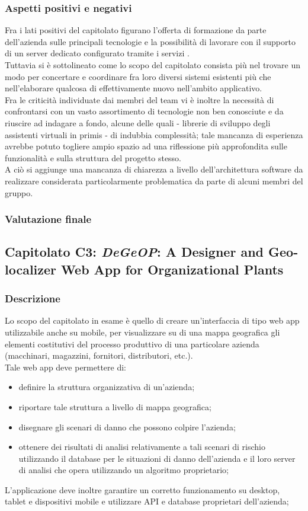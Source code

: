 		\subsubsection{Aspetti positivi e negativi}
		Fra i lati positivi del capitolato figurano l'offerta di formazione da parte dell'azienda sulle principali tecnologie e la possibilità di 
		lavorare con il supporto di un server dedicato configurato tramite i servizi .\\
		Tuttavia si è sottolineato come lo scopo del capitolato consista più nel trovare un modo per concertare e coordinare fra loro diversi sistemi 
		esistenti più che nell'elaborare qualcosa di effettivamente nuovo nell'ambito applicativo.\\
		Fra le criticità individuate dai membri del team vi è inoltre la necessità di confrontarsi con un vasto assortimento di tecnologie non ben 
		conosciute e da riuscire ad indagare a fondo, alcune delle quali - librerie di sviluppo degli assistenti virtuali in primis - di indubbia 
		complessità; tale mancanza di esperienza avrebbe potuto togliere ampio spazio ad una riflessione più approfondita sulle funzionalità e sulla 
		struttura del progetto stesso.\\
		A ciò si aggiunge una mancanza di chiarezza a livello dell'architettura software da realizzare considerata particolarmente problematica da 
		parte di alcuni membri del gruppo.
		\subsubsection{Valutazione finale}
		
	\subsection{Capitolato C3: \emph{DeGeOP}: A Designer and Geo-localizer Web App for Organizational Plants}
		\subsubsection{Descrizione}
		Lo scopo del capitolato in esame è quello di creare un'interfaccia di tipo web app utilizzabile anche su mobile, per visualizzare su di una 
		mappa geografica gli elementi costitutivi del processo produttivo di una particolare azienda (macchinari, magazzini, fornitori, distributori, etc.).
		\\Tale web app deve permettere di:
		\begin{itemize}
			\item definire la struttura organizzativa di un'azienda;
			\item riportare tale struttura a livello di mappa geografica;
			\item disegnare gli scenari di danno che possono colpire l'azienda;
			\item ottenere dei risultati di analisi relativamente a tali scenari di rischio utilizzando il database per le situazioni di danno dell'azienda e il loro server di analisi che opera utilizzando un algoritmo proprietario;
		\end{itemize}
		L'applicazione deve inoltre garantire un corretto funzionamento su desktop, tablet e dispositivi mobile e utilizzare API e database proprietari dell'azienda;
